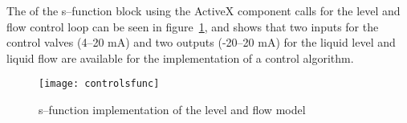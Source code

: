 \begin{example}
The of the s--function block using the ActiveX component  calls for the level and flow control loop can be seen in figure~\ref{fig:control:sfunc}, and shows that two inputs for the control valves (4--20 mA) and two outputs (-20--20 mA) for the liquid level and liquid flow are available for the implementation of a control algorithm.
\begin{figure}[htbp]
	\centering
	\texttt{[image: controlsfunc]}
	\caption{s--function implementation of the level and flow model}
	\label{fig:control:sfunc}
\end{figure}

\end{example}
	  